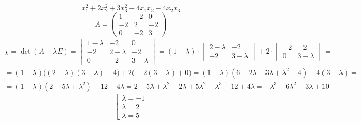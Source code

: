 $$ x_1^2 + 2x_2^2 + 3x_3^2 - 4x_1x_2 - 4x_2x_3 $$
$$ A =
\begin{pmatrix}
	1 & -2 & 0 \\
    -2 & 2 & -2 \\
    0 & -2 & 3
\end{pmatrix} $$
\begin{multline*}
    \chi = \det(A - \lambda E) =
    \begin{vmatrix}
        1 - \lambda & -2 & 0 \\
        -2 & 2 - \lambda & -2 \\
        0 & -2 & 3 - \lambda
    \end{vmatrix} = (1 - \lambda) \cdot
    \begin{vmatrix}
    	2 - \lambda & -2 \\
        -2 & 3 - \lambda
    \end{vmatrix} + 2 \cdot
    \begin{vmatrix}
    	-2 & -2 \\
        0 & 3 - \lambda
    \end{vmatrix} = \\
    = (1 - \lambda) \bigg( (2 - \lambda)(3 - \lambda) - 4 \bigg) + 2 \bigg( -2(3 - \lambda) + 0 \bigg) = (1 - \lambda)(6 - 2\lambda - 3\lambda + \lambda^2 - 4) - 4(3 - \lambda) = \\
    = (1 - \lambda)(2 - 5\lambda + \lambda^2) - 12 + 4\lambda = 2 - 5\lambda + \lambda^2 - 2\lambda + 5\lambda^2 - \lambda^3 - 12 + 4\lambda = -\lambda^3 + 6\lambda^2 - 3\lambda + 10
\end{multline*}
$$ \left[
\begin{aligned}
	\lambda = -1 \\
    \lambda = 2 \\
    \lambda = 5
\end{aligned} \right. $$


